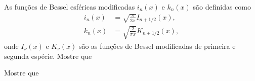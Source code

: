 \documentclass[a4paper,12pt, leqno, answers]{exam}
\begin{document}
\begin{questions}

    As fun\c{c}\~{o}es de Bessel esf\'{e}ricas modificadas $i_n(x)$ e $k_n(x)$ s\~{a}o definidas como
    \begin{align}
        i_n(x) &= \sqrt{\frac{\pi}{2x}} I_{n + 1/2}(x), \label{eq:bessel_esf_mod_prim} \\
        k_n(x) &= \sqrt{\frac{2}{\pi x}} K_{n + 1/2}(x), \label{eq:bessel_esf_mod_seg}
    \end{align}
    onde $I_\nu(x)$ e $K_\nu(x)$ s\~{a}o as fun\c{c}\~{o}es de Bessel modificadas de primeira e segunda esp\'{e}cie.
    \question Mostre que

    \question Mostre que
    \begin{parts}

\end{parts}
\end{questions}
\end{document}
